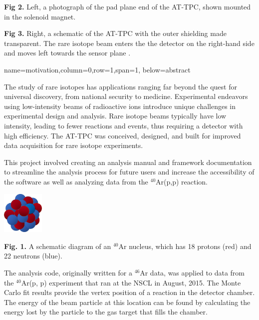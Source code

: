\documentclass[ansiepaper,portrait]{baposter}
\begin{document}
\begin{poster}
{\small{\textbf{Fig 2.} Left, a photograph of the pad plane end of the AT-TPC, shown mounted in the solenoid magnet.}

\small{\textbf{Fig 3.} Right, a schematic of the AT-TPC with the outer shielding made transparent. The rare isotope beam enters the the detector on the right-hand side and moves left towards the sensor plane \cite{Bradt-thesis}.}

}
{name=motivation,column=0,row=1,span=1, below=abstract}
{\small{The study of rare isotopes has applications ranging far beyond the quest for universal discovery, from national security to medicine. Experimental endeavors using low-intensity beams of radioactive ions introduce unique challenges in experimental design and analysis. Rare isotope beams typically have low intensity, leading to fewer reactions and events, thus requiring a detector with high efficiency. The AT-TPC was conceived, designed, and built for improved data acquisition for rare isotope experiments. 

This project involved creating an analysis manual and framework documentation to streamline the analysis process for future users and increase the accessibility of the software as well as analyzing data from the $^{40}$Ar(p,p) reaction.}

\begin{center}
\includegraphics[width=20mm]{ar40_nucleus.png}
\end{center}

\small{\textbf{Fig. 1.} A schematic diagram of an $^{40}$Ar nucleus, which has 18 protons (red) and 22 neutrons (blue).}
}
{\small{The analysis code, originally written for a $^{46}$Ar data, was applied to data from the $^{40}$Ar(p, p) experiment that ran at the NSCL in August,  2015.}
\small{The Monte Carlo fit results provide the vertex position of a reaction in the detector chamber. The energy of the beam particle at this location can be found by calculating the energy lost by the particle to the gas target that fills the chamber.}

}
\end{poster}
\end{document}
